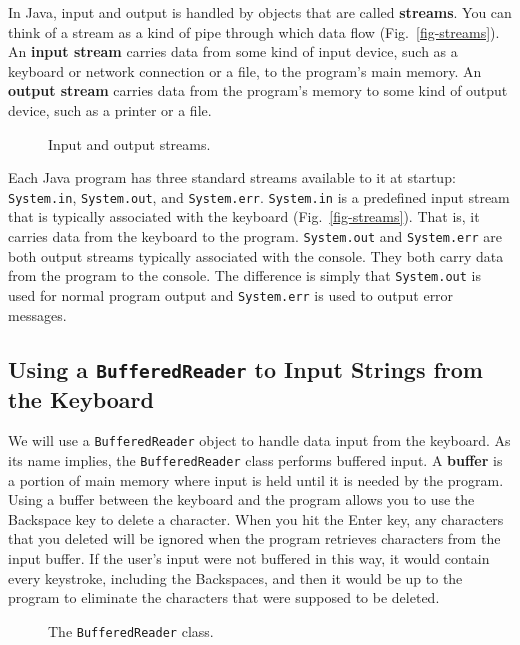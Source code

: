 In Java, input and output is handled by objects that are called
{\bf streams}.  You can think of a stream as a kind of pipe through
which data flow (Fig.~\ref{fig-streams}).  An {\bf input stream}
carries data from some kind of input device, such as a keyboard or
network connection or a file, to the program's main memory. An {\bf
output stream} carries data from the program's memory to some kind of
output device, such as a printer or a file.

\begin{figure}[h]
{Input and output streams.
\label{fig-streams}
\label{pg-fig-streams}}
\end{figure}

Each Java program has three standard streams available to it at
startup: {\tt System.in}, {\tt System.out}, and {\tt System.err}.
{\tt System.in} is a predefined input stream that is typically
associated with the keyboard (Fig.~\ref{fig-streams}). That is, it
carries data from the keyboard to the program. {\tt System.out} and
{\tt System.err} are both output streams typically associated with the
console.  They both carry data from the program to the console.  The
difference is simply that {\tt System.out} is used for normal program
output and {\tt System.err} is used to output error messages.

\subsection{Using a {\tt BufferedReader} to Input Strings from the Keyboard}

We will use a {\tt BufferedReader} object to handle data input from
the keyboard. As its name implies, the {\tt BufferedReader} class
performs buffered input. A {\bf buffer} is a portion of main memory
where input is held until it is needed by the program. Using a
 buffer between the keyboard and the
program allows you to use the Backspace key to delete a
character. When you hit the Enter key, any characters that you deleted
will be ignored when the program retrieves characters from the input
buffer. If the user's input were not buffered in this way, it would
contain every keystroke, including the Backspaces, and then it would
be up to the program to eliminate the characters that were
supposed to be deleted.

\begin{figure}[h]
{The {\tt Buf\-fer\-ed\-Read\-er} class.
\label{fig-buffrdr}
\label{pg-fig-buffrdr}}
\end{figure}

